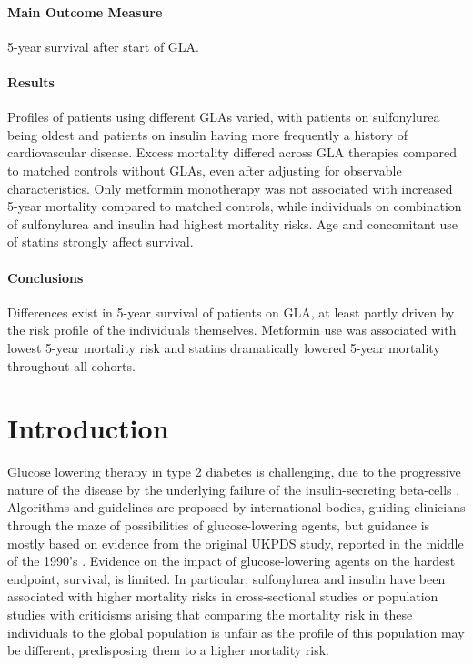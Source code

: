 {\paragraph{Main Outcome Measure} 5-year survival after start of GLA. 

\paragraph{Results} Profiles of patients using different GLAs varied, with patients on sulfonylurea being oldest and patients on insulin having more frequently a history of cardiovascular disease. Excess mortality differed across GLA therapies compared to matched controls without GLAs, even after adjusting for observable characteristics. Only metformin monotherapy was not associated with increased 5-year mortality compared to matched controls, while individuals on combination of sulfonylurea and insulin had highest mortality risks. Age and concomitant use of statins strongly affect survival. 

\paragraph{Conclusions} Differences exist in 5-year survival of patients on GLA, at least partly driven by the risk profile of the individuals themselves. Metformin use was associated with lowest 5-year mortality risk and statins dramatically lowered 5-year mortality throughout all cohorts.
}



\cleardoublepage

\section{Introduction}
Glucose lowering therapy in type 2 diabetes is challenging, due to the progressive nature of the disease by the underlying failure of the insulin-secreting beta-cells \citep{s1}. Algorithms and guidelines are proposed by international bodies, guiding clinicians through the maze of possibilities of glucose-lowering agents, but guidance is mostly based on evidence from the original UKPDS study, reported in the middle of the 1990's \citep{s2}. Evidence on the impact of glucose-lowering agents on the hardest endpoint, survival, is limited. In particular, sulfonylurea and insulin have been associated with higher mortality risks in cross-sectional studies or population studies \citep{s3,s4,s5,s6,s7,s8} with criticisms arising that comparing the mortality risk in these individuals to the global population is unfair as the profile of this population may be different, predisposing them to a higher mortality risk. 

